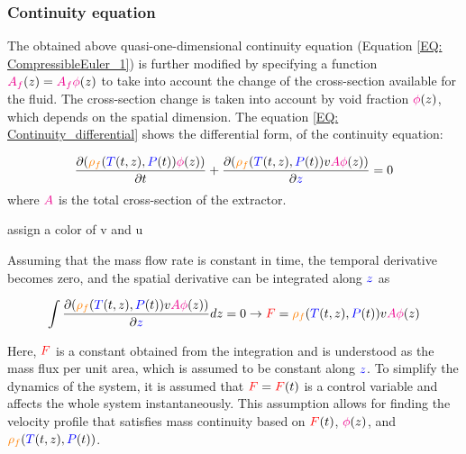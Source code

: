 \documentclass[../Article_Model_Parameters.tex]{subfiles}
\begin{document}
		
	\subsubsection{Continuity equation} \label{CH: Continuity}
	The obtained above quasi-one-dimensional continuity equation (Equation \ref{EQ: CompressibleEuler_1}) is further modified by specifying a function ${\color{magenta}A_f}(z) = {\color{magenta}A_f\phi}(z)$ to take into account the change of the cross-section available for the fluid. The cross-section change is taken into account by void fraction ${\color{magenta}\phi}(z)$, which depends on the spatial dimension. The equation \ref{EQ: Continuity_differential} shows the differential form, of the continuity equation: 
	
	{\footnotesize
		\begin{equation} \label{EQ: Continuity_differential}
			\frac{\partial ({\color{orange}\rho_f}({\color{blue}T}(t,z),{\color{blue}P}(t)) {\color{magenta}\phi}(z))}{\partial t} + \frac{\partial ({\color{orange}\rho_f}({\color{blue}T}(t,z),{\color{blue}P}(t)) v {\color{magenta}A\phi}(z))}{\partial {\color{blue}z}} = 0
		\end{equation}
	}
	where ${\color{magenta} A}$ is the total cross-section of the extractor.
	
	{\color{red}assign a color of v and u}
	
	Assuming that the mass flow rate is constant in time, the temporal derivative becomes zero, and the spatial derivative can be integrated along ${\color{blue}z}$ as
	
	{\footnotesize
		\begin{equation}
			\int \frac{\partial ({\color{orange}\rho_f}({\color{blue}T}(t,z),{\color{blue}P}(t)) v {\color{magenta}A \phi}(z) )}{\partial {\color{blue}z}} dz = 0 \rightarrow {\color{red}F}={\color{orange}\rho_f}({\color{blue}T}(t,z),{\color{blue}P}(t)) v {\color{magenta}A\phi}(z)
		\end{equation}
	}
	
	Here, ${\color{red}F}$ is a constant obtained from the integration and is understood as the mass flux per unit area, which is assumed to be constant along ${\color{blue}z}$. To simplify the dynamics of the system, it is assumed that ${\color{red}F}={\color{red}F}(t)$ is a control variable and affects the whole system instantaneously. This assumption allows for finding the velocity profile that satisfies mass continuity based on ${\color{red}F}(t)$, ${\color{magenta}\phi}(z)$, and ${\color{orange}\rho_f}({\color{blue}T}(t,z),{\color{blue}P}(t))$.
	
\end{document}

